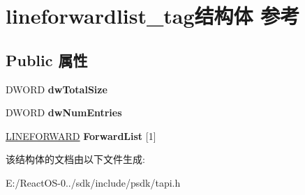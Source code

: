 \hypertarget{structlineforwardlist__tag}{}\section{lineforwardlist\+\_\+tag结构体 参考}
\label{structlineforwardlist__tag}
\subsection*{Public 属性}
\begin{DoxyCompactItemize}
\item 
\mbox{\label{structlineforwardlist__tag_a2a0bb22e1bdeb9fc18361aaca76d5a69}} 
D\+W\+O\+RD {\bfseries dw\+Total\+Size}
\item 
\mbox{\label{structlineforwardlist__tag_aaaf27993b0df096dd6b7f9bb3cb23c43}} 
D\+W\+O\+RD {\bfseries dw\+Num\+Entries}
\item 
\mbox{\label{structlineforwardlist__tag_a744e1784eeb31eec638cceaa975e9542}} 
\hyperlink{structlineforward__tag}{L\+I\+N\+E\+F\+O\+R\+W\+A\+RD} {\bfseries Forward\+List} \mbox{[}1\mbox{]}
\end{DoxyCompactItemize}


该结构体的文档由以下文件生成\+:\begin{DoxyCompactItemize}
\item 
E\+:/\+React\+O\+S-\/0../sdk/include/psdk/tapi.\+h\end{DoxyCompactItemize}
